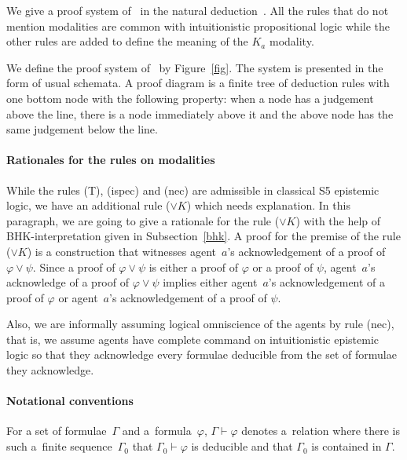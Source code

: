   We give a proof system of \iec\, in the natural deduction~\citep{gentzen, prawitz1971ideas}.
  All the rules that do not mention modalities are common with
  intuitionistic propositional logic while the other rules are added
  to define the meaning of the $K_a$ modality.
  \begin{definition}
   We define the proof system of \iec\, by Figure~\ref{fig}.
   The system is presented in the form of usual schemata.
   A proof diagram is a finite tree of deduction rules with one bottom node with the
   following property: when a node has a judgement
   above the line, there is a node immediately above it and the above node
   has the same judgement below the line.
  \end{definition}

    \paragraph{Rationales for the rules on modalities}

    While the rules (T), (ispec) and (nec) are admissible in classical S5 epistemic logic,
    we have an additional rule ($\vee K$) which needs explanation.
    In this paragraph, we are going to give a rationale for the rule ($\vee K$) with the help
    of BHK-interpretation given in Subsection~\ref{bhk}.
    A proof for the premise of the rule ($\vee K$) is a construction that witnesses agent~$a$'s
    acknowledgement of a proof of $\varphi\vee\psi$.
    Since a proof of $\varphi\vee\psi$ is either a proof of $\varphi$ or a proof of $\psi$,
    agent~$a$'s acknowledge of a proof of $\varphi\vee\psi$ implies either agent~$a$'s
    acknowledgement of a proof of $\varphi$ or agent~$a$'s acknowledgement of a proof of $\psi$.

    Also,
    we are informally
    assuming logical omniscience of the agents by rule (nec),
    that is, we assume agents have complete
    command on intuitionistic epistemic logic so that they acknowledge every formulae
    deducible from the set of formulae they acknowledge.

    \paragraph{Notational conventions}
    For a set of formulae~$\Gamma$ and a~formula~$\varphi$, $\Gamma\vdash
    \varphi$ denotes a~relation where
    there is such a~finite sequence~$\Gamma_0$ that
    $\Gamma_0\vdash
    \varphi$ is deducible and that $\Gamma_0$ is contained in $\Gamma$.

